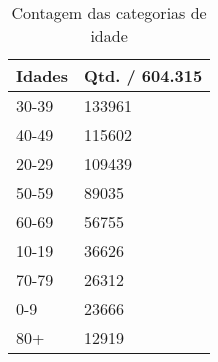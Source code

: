 \begin{table}[H]
  \centering
  \centering
  \begin{tabular}{ll}
  \hline
  \multicolumn{1}{|l|}{\textbf{Idades}} & \multicolumn{1}{l|}{\textbf{Qtd. / 604.315}} \\ \hline
  30-39                                 & 133961                                   \\
  40-49                                 & 115602                                   \\
  20-29                                 & 109439                                   \\
  50-59                                 & 89035                                    \\
  60-69                                 & 56755                                    \\
  10-19                                 & 36626                                    \\
  70-79                                 & 26312                                    \\
  0-9                                   & 23666                                    \\
  80+                                   & 12919                                   
  \end{tabular}
  \caption{Contagem das categorias de idade}
  \label{tbl:tabela-categoria-idade}  
  \end{table}